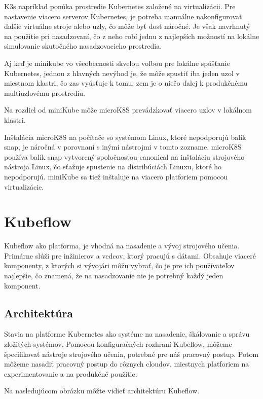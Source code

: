 K3s napríklad ponúka prostredie Kubernetes založené na virtualizácii. Pre nastavenie viacero serverov Kubernetes, je potreba manuálne nakonfigurovať ďalšie virtuálne stroje alebo uzly, čo môže byť dosť náročné. Je však navrhnutý na použitie pri nasadzovaní, čo z neho robí jednu z najlepších možností na lokálne simulovanie skutočného nasadzovacieho prostredia.

Aj keď je minikube vo všeobecnosti skvelou voľbou pre lokálne spúšťanie Kubernetes, jednou z hlavných nevýhod je, že môže spustiť iba jeden uzol v miestnom klastri, čo zas vyúsťuje k tomu, zem je o niečo ďalej k produkčnému multiuzlovému prostrediu.

Na rozdiel od miniKube môže microK8S prevádzkovať viacero uzlov v lokálnom klastri.

Inštalácia microK8S na počítače so systémom Linux, ktoré nepodporujú balík snap, je náročná v porovnaní s inými nástrojmi v tomto zozname. microK8S používa balík snap vytvorený spoločnosťou canonical na inštaláciu strojového nástroja Linux, čo sťažuje spustenie na distribúciách Linuxu, ktoré ho nepodporujú. miniKube sa tiež inštaluje na viacero platforiem pomocou virtualizácie.


\section{Kubeflow}
Kubeflow ako platforma, je vhodná na nasadenie a vývoj strojového učenia. Primárne slúži pre inžinierov a vedcov, ktorý pracujú s dátami. Obsahuje viaceré komponenty, z ktorých si vývojári môžu vybrať, čo je pre ich používateľov najlepšie, čo znamená, že na nasadzovanie nie je potrebný každý jeden komponent.\cite{web}
\subsection{Architektúra}

Stavia na platforme Kubernetes ako systéme na nasadenie, škálovanie a správu zložitých systémov. Pomocou konfiguračných rozhraní Kubeflow, môžeme špecifikovať nástroje strojového učenia, potrebné pre náš pracovný postup. Potom môžeme nasadiť pracovný postup do rôznych cloudov, miestnych platforiem na experimentovanie a na produkčné použitie.\cite{web}

Na nasledujúcom obrázku môžte vidieť architektúru Kubeflow.

